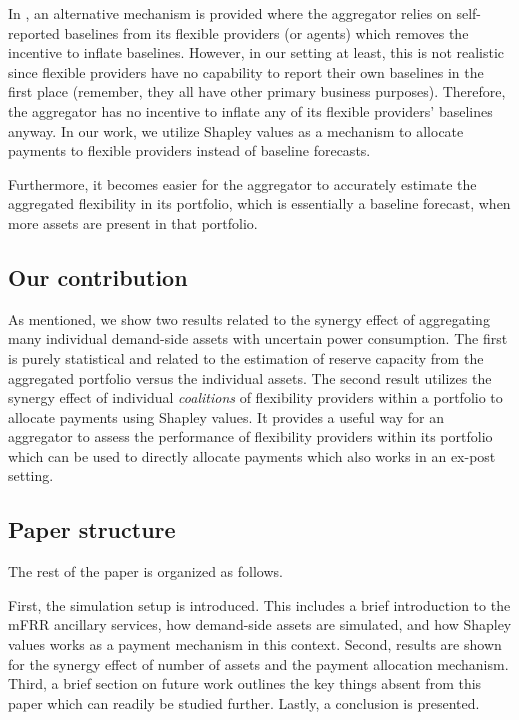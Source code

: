 \documentclass[lettersize,journal]{IEEEtran}
\begin{document}
In \cite{muthirayan2019mechanism}, an alternative mechanism is provided where the aggregator relies on self-reported baselines from its flexible providers (or agents) which removes the incentive to inflate baselines. However, in our setting at least, this is not realistic since flexible providers have no capability to report their own baselines in the first place (remember, they all have other primary business purposes). Therefore, the aggregator has no incentive to inflate any of its flexible providers' baselines anyway. In our work, we utilize Shapley values \cite{shapley1997value} as a mechanism to allocate payments to flexible providers instead of baseline forecasts.

Furthermore, it becomes easier for the aggregator to accurately estimate the aggregated flexibility in its portfolio, which is essentially a baseline forecast, when more assets are present in that portfolio.


\subsection{Our contribution}

As mentioned, we show two results related to the synergy effect of aggregating many individual demand-side assets with uncertain power consumption. The first is purely statistical and related to the estimation of reserve capacity from the aggregated portfolio versus the individual assets. The second result utilizes the synergy effect of individual \textit{coalitions} of flexibility providers within a portfolio to allocate payments using Shapley values. It provides a useful way for an aggregator to assess the performance of flexibility providers within its portfolio which can be used to directly allocate payments which also works in an ex-post setting.

\subsection{Paper structure}

The rest of the paper is organized as follows.

First, the simulation setup is introduced. This includes a brief introduction to the mFRR ancillary services, how demand-side assets are simulated, and how Shapley values works as a payment mechanism in this context. Second, results are shown for the synergy effect of number of assets and the payment allocation mechanism. Third, a brief section on future work outlines the key things absent from this paper which can readily be studied further. Lastly, a conclusion is presented.
\end{document}
